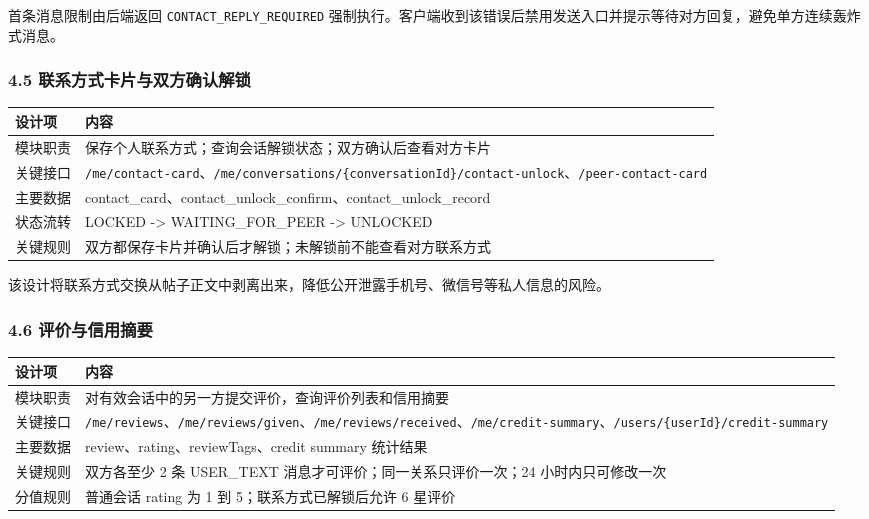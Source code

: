 \documentclass[
]{ctexart}
\begin{document}
首条消息限制由后端返回 \texttt{CONTACT\_REPLY\_REQUIRED}
强制执行。客户端收到该错误后禁用发送入口并提示等待对方回复，避免单方连续轰炸式消息。

\hypertarget{ux8054ux7cfbux65b9ux5f0fux5361ux7247ux4e0eux53ccux65b9ux786eux8ba4ux89e3ux9501}{%
\subsubsection{4.5
联系方式卡片与双方确认解锁}\label{ux8054ux7cfbux65b9ux5f0fux5361ux7247ux4e0eux53ccux65b9ux786eux8ba4ux89e3ux9501}}

\begin{longtable}[]{@{}
  >{\raggedright\arraybackslash}p{}
  >{\raggedright\arraybackslash}p{}@{}}
\toprule
设计项 & 内容 \\
\midrule
\endhead
模块职责 & 保存个人联系方式；查询会话解锁状态；双方确认后查看对方卡片 \\
关键接口 &
\texttt{/me/contact-card}、\texttt{/me/conversations/\{conversationId\}/contact-unlock}、\texttt{/peer-contact-card} \\
主要数据 &
contact\_card、contact\_unlock\_confirm、contact\_unlock\_record \\
状态流转 & LOCKED -\textgreater{} WAITING\_FOR\_PEER -\textgreater{}
UNLOCKED \\
关键规则 & 双方都保存卡片并确认后才解锁；未解锁前不能查看对方联系方式 \\
\bottomrule
\end{longtable}

该设计将联系方式交换从帖子正文中剥离出来，降低公开泄露手机号、微信号等私人信息的风险。

\hypertarget{ux8bc4ux4ef7ux4e0eux4fe1ux7528ux6458ux8981}{%
\subsubsection{4.6
评价与信用摘要}\label{ux8bc4ux4ef7ux4e0eux4fe1ux7528ux6458ux8981}}

\begin{longtable}[]{@{}
  >{\raggedright\arraybackslash}p{}
  >{\raggedright\arraybackslash}p{}@{}}
\toprule
设计项 & 内容 \\
\midrule
\endhead
模块职责 & 对有效会话中的另一方提交评价，查询评价列表和信用摘要 \\
关键接口 &
\texttt{/me/reviews}、\texttt{/me/reviews/given}、\texttt{/me/reviews/received}、\texttt{/me/credit-summary}、\texttt{/users/\{userId\}/credit-summary} \\
主要数据 & review、rating、reviewTags、credit summary 统计结果 \\
关键规则 & 双方各至少 2 条 USER\_TEXT
消息才可评价；同一关系只评价一次；24 小时内只可修改一次 \\
分值规则 & 普通会话 rating 为 1 到 5；联系方式已解锁后允许 6 星评价 \\
\bottomrule
\end{longtable}
\end{document}
